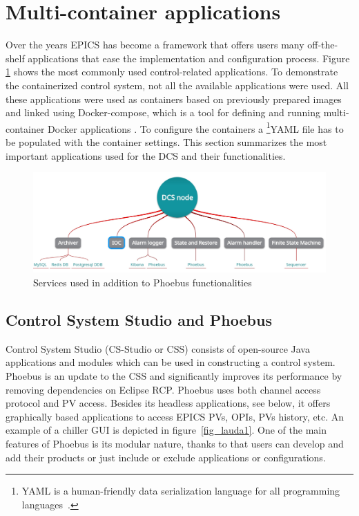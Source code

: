 \section{Multi-container applications}
Over the years EPICS has become a framework that offers users many off-the-shelf applications that ease the implementation and configuration process. Figure \ref{fig_dcs_node_msts} shows the most commonly used control-related applications. 
To demonstrate the containerized control system, not all the available applications were used. All these applications were used as containers based on previously prepared images and linked using Docker-compose, which is a tool for defining and running multi-container Docker applications \cite{docker_compose}. To configure the containers a \footnote{  YAML is a human-friendly data serialization language for all programming languages~\cite{YAML}.}{YAML} file has to be populated with the container settings. This section summarizes the most important applications used for the DCS and their functionalities.


\begin{figure}[!h]
\centering
\includegraphics[width=0.95\columnwidth]{Chapter4/images/dcs_node.jpg}
\caption{Services used in addition to Phoebus functionalities}
\label{fig_dcs_node_msts}
\end{figure}
\subsection{Control System Studio and Phoebus}
Control System Studio (CS-Studio or CSS) consists of open-source Java applications and modules which can be used in constructing a control system. Phoebus is an update to the \gls{CSS} and significantly improves its performance by removing dependencies on Eclipse RCP. Phoebus uses both channel access protocol and PV access. Besides its headless applications, see below, it offers graphically based applications to access EPICS PVs, OPIs, PVs history, etc. An example of a chiller GUI is depicted in figure~\ref{fig_lauda1}. One of the main features of Phoebus is its modular nature, thanks to that users can develop and add their products or just include or exclude applications or configurations. 


